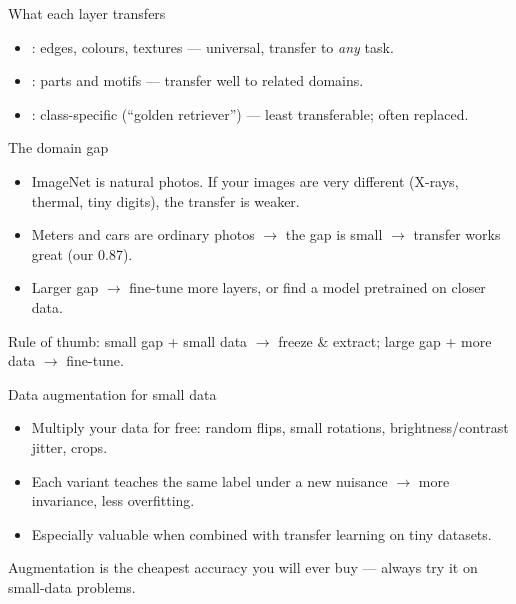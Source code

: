 \documentclass[10pt,aspectratio=169]{beamer}
\begin{document}
\begin{frame}{What each layer transfers}
  \begin{itemize}
    \item {}: edges, colours, textures — universal, transfer to \emph{any} task.
    \item {}: parts and motifs — transfer well to related domains.
    \item {}: class-specific (``golden retriever'') — least transferable; often replaced.
  \end{itemize}
\end{frame}

\begin{frame}{The domain gap}
  \begin{itemize}
    \item ImageNet is natural photos. If your images are very different (X-rays, thermal, tiny digits),
          the transfer is weaker.
    \item Meters and cars are ordinary photos $\rightarrow$ the gap is small $\rightarrow$ transfer works great (our 0.87).
    \item Larger gap $\rightarrow$ fine-tune more layers, or find a model pretrained on closer data.
  \end{itemize}
  \begin{mathbox}
    Rule of thumb: small gap + small data $\rightarrow$ freeze \& extract; large gap + more data $\rightarrow$ fine-tune.
  \end{mathbox}
\end{frame}

\begin{frame}{Data augmentation for small data}
  \begin{itemize}
    \item Multiply your data for free: random flips, small rotations, brightness/contrast jitter, crops.
    \item Each variant teaches the same label under a new nuisance $\rightarrow$ more invariance, less overfitting.
    \item Especially valuable when combined with transfer learning on tiny datasets.
  \end{itemize}
  \begin{goodbox}
    Augmentation is the cheapest accuracy you will ever buy — always try it on small-data problems.
  \end{goodbox}
\end{frame}
\end{document}
